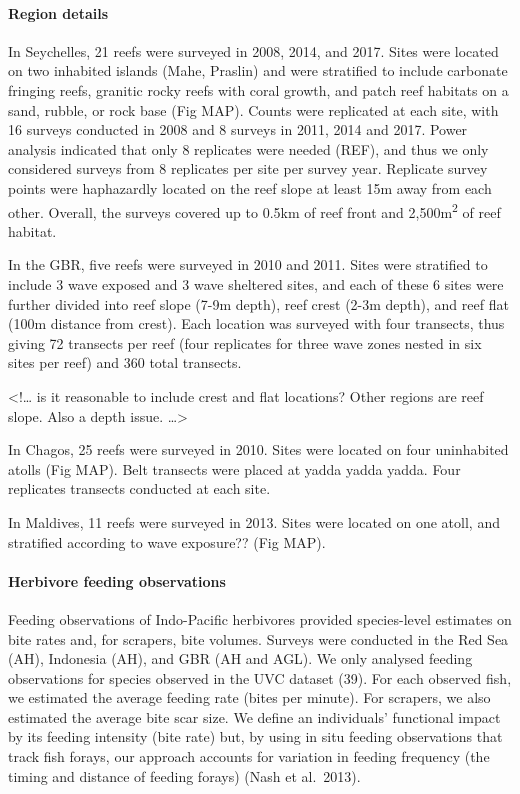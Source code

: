 \documentclass[]{article}
\let\oldparagraph\paragraph
\renewcommand{\paragraph}[1]{\oldparagraph{#1}\mbox{}}
\begin{document}
\hypertarget{region-details}{%
\paragraph{Region details}\label{region-details}}

In Seychelles, 21 reefs were surveyed in 2008, 2014, and 2017. Sites
were located on two inhabited islands (Mahe, Praslin) and were
stratified to include carbonate fringing reefs, granitic rocky reefs
with coral growth, and patch reef habitats on a sand, rubble, or rock
base (Fig MAP). Counts were replicated at each site, with 16 surveys
conducted in 2008 and 8 surveys in 2011, 2014 and 2017. Power analysis
indicated that only 8 replicates were needed (REF), and thus we only
considered surveys from 8 replicates per site per survey year. Replicate
survey points were haphazardly located on the reef slope at least 15m
away from each other. Overall, the surveys covered up to 0.5km of reef
front and 2,500m\textsuperscript{2} of reef habitat.

In the GBR, five reefs were surveyed in 2010 and 2011. Sites were
stratified to include 3 wave exposed and 3 wave sheltered sites, and
each of these 6 sites were further divided into reef slope (7-9m depth),
reef crest (2-3m depth), and reef flat (100m distance from crest). Each
location was surveyed with four transects, thus giving 72 transects per
reef (four replicates for three wave zones nested in six sites per reef)
and 360 total transects.

\textless{}!\ldots{} is it reasonable to include crest and flat
locations? Other regions are reef slope. Also a depth issue.
\ldots{}\textgreater{}

In Chagos, 25 reefs were surveyed in 2010. Sites were located on four
uninhabited atolls (Fig MAP). Belt transects were placed at yadda yadda
yadda. Four replicates transects conducted at each site.

In Maldives, 11 reefs were surveyed in 2013. Sites were located on one
atoll, and stratified according to wave exposure?? (Fig MAP).

\hypertarget{herbivore-feeding-observations}{%
\paragraph{Herbivore feeding
observations}\label{herbivore-feeding-observations}}

Feeding observations of Indo-Pacific herbivores provided species-level
estimates on bite rates and, for scrapers, bite volumes. Surveys were
conducted in the Red Sea (AH), Indonesia (AH), and GBR (AH and AGL). We
only analysed feeding observations for species observed in the UVC
dataset (39). For each observed fish, we estimated the average feeding
rate (bites per minute). For scrapers, we also estimated the average
bite scar size. We define an individuals' functional impact by its
feeding intensity (bite rate) but, by using in situ feeding observations
that track fish forays, our approach accounts for variation in feeding
frequency (the timing and distance of feeding forays) (Nash et
al.~2013).
\end{document}
